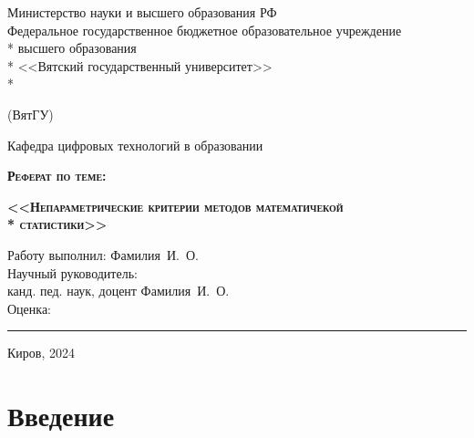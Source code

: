 \documentclass[12pt]{article}
\date{}
\begin{document}

\begin{titlepage}
    \begin{center}
        Министерство науки и высшего образования РФ \\
        \vspace{1cm}
        Федеральное государственное бюджетное образовательное учреждение \\*
        высшего образования \\*
        <<Вятский государственный университет>> \\*
        \begin{center}
            (ВятГУ)
        \end{center}
        \begin{center}
            Кафедра цифровых технологий в образовании
        \end{center}
        \vspace{10.5em}
        \begin{center}
            \textsc{\textbf{Реферат по теме:}}
        \end{center}
        \begin{center}
            \textsc{\textbf{<<Непараметрические критерии методов математичекой \\*
            статистики>>}}
        \end{center}
        \vspace{6em}
        \begin{flushleft}
            Работу выполнил: \hrulefill Фамилия~И.~О. \\
            \vspace{1.5em}
            Научный руководитель: \\
            канд. пед. наук, доцент \hrulefill Фамилия~И.~О. \\
            \vspace{1.5em}
            Оценка: \rule{5cm}{.5pt}
        \end{flushleft}
        \vspace{\fill}
        \begin{center}
            Киров, 2024
        \end{center}
    \end{center}
\end{titlepage}

\setcounter{page}{2}
\tableofcontents
\newpage

\section*{Введение}
\end{document}

